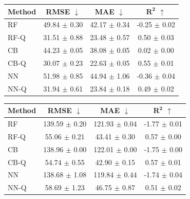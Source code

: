 \begin{table}[t]
    \vspace{1em}

    \begin{minipage}{0.48\textwidth}
        \centering
        \label{tab:ood-a100}
        \begin{tabular}{lccc}
            \toprule
            \textbf{Method} & \textbf{RMSE} $\downarrow$ & \textbf{MAE} $\downarrow$ & $\boldsymbol{R^2}$ $\uparrow$ \\
            \midrule
            RF      & 49.84 $\pm$ 0.30 & 42.17 $\pm$ 0.34 & -0.25 $\pm$ 0.02 \\
            RF-Q    & 31.51 $\pm$ 0.88 & 23.48 $\pm$ 0.57 & 0.50 $\pm$ 0.03 \\
            \midrule
            CB      & 44.23 $\pm$ 0.05 & 38.08 $\pm$ 0.05 & 0.02 $\pm$ 0.00 \\
            CB-Q    & 30.07 $\pm$ 0.23 & 22.63 $\pm$ 0.05 & 0.55 $\pm$ 0.01 \\
            \midrule
            NN      & 51.98 $\pm$ 0.85 & 44.94 $\pm$ 1.06 & -0.36 $\pm$ 0.04 \\
            NN-Q    & 31.94 $\pm$ 0.61 & 23.84 $\pm$ 0.18 & 0.49 $\pm$ 0.02 \\
            \bottomrule
        \end{tabular}
    \end{minipage}
    \hfill
    \begin{minipage}{0.48\textwidth}
        \centering
        \label{tab:ood-h100}
        \begin{tabular}{lccc}
            \toprule
            \textbf{Method} & \textbf{RMSE} $\downarrow$ & \textbf{MAE} $\downarrow$ & $\boldsymbol{R^2}$ $\uparrow$ \\
            \midrule
            RF      & 139.59 $\pm$ 0.20 & 121.93 $\pm$ 0.04 & -1.77 $\pm$ 0.01 \\
            RF-Q    & 55.06 $\pm$ 0.21 & 43.41 $\pm$ 0.30 & 0.57 $\pm$ 0.00 \\
            \midrule
            CB      & 138.96 $\pm$ 0.00 & 122.01 $\pm$ 0.00 & -1.75 $\pm$ 0.00 \\
            CB-Q    & 54.74 $\pm$ 0.55 & 42.90 $\pm$ 0.15 & 0.57 $\pm$ 0.01 \\
            \midrule
            NN      & 138.68 $\pm$ 1.08 & 119.84 $\pm$ 0.44 & -1.74 $\pm$ 0.04 \\
            NN-Q    & 58.69 $\pm$ 1.23 & 46.75 $\pm$ 0.87 & 0.51 $\pm$ 0.02 \\
            \bottomrule
        \end{tabular}
    \end{minipage}
\end{table}